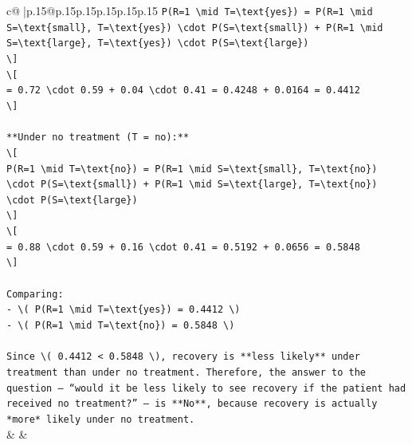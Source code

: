 \documentclass{article}
\begin{document}
{\begin{supertabular}{c@{$\;$}|p{.15\linewidth}@{}p{.15\linewidth}p{.15\linewidth}p{.15\linewidth}p{.15\linewidth}p{.15\linewidth}}
{{{\texttt{P(R=1 \textbackslash{}mid T=\textbackslash{}text\{yes\}) = P(R=1 \textbackslash{}mid S=\textbackslash{}text\{small\}, T=\textbackslash{}text\{yes\}) \textbackslash{}cdot P(S=\textbackslash{}text\{small\}) + P(R=1 \textbackslash{}mid S=\textbackslash{}text\{large\}, T=\textbackslash{}text\{yes\}) \textbackslash{}cdot P(S=\textbackslash{}text\{large\})} \\
\texttt{\textbackslash{}{]}} \\
\texttt{\textbackslash{}{[}} \\
\texttt{= 0.72 \textbackslash{}cdot 0.59 + 0.04 \textbackslash{}cdot 0.41 = 0.4248 + 0.0164 = 0.4412} \\
\texttt{\textbackslash{}{]}} \\
\\ 
\texttt{**Under no treatment (T = no):**} \\
\texttt{\textbackslash{}{[}} \\
\texttt{P(R=1 \textbackslash{}mid T=\textbackslash{}text\{no\}) = P(R=1 \textbackslash{}mid S=\textbackslash{}text\{small\}, T=\textbackslash{}text\{no\}) \textbackslash{}cdot P(S=\textbackslash{}text\{small\}) + P(R=1 \textbackslash{}mid S=\textbackslash{}text\{large\}, T=\textbackslash{}text\{no\}) \textbackslash{}cdot P(S=\textbackslash{}text\{large\})} \\
\texttt{\textbackslash{}{]}} \\
\texttt{\textbackslash{}{[}} \\
\texttt{= 0.88 \textbackslash{}cdot 0.59 + 0.16 \textbackslash{}cdot 0.41 = 0.5192 + 0.0656 = 0.5848} \\
\texttt{\textbackslash{}{]}} \\
\\ 
\texttt{Comparing:} \\
\texttt{{-} \textbackslash{}( P(R=1 \textbackslash{}mid T=\textbackslash{}text\{yes\}) = 0.4412 \textbackslash{})} \\
\texttt{{-} \textbackslash{}( P(R=1 \textbackslash{}mid T=\textbackslash{}text\{no\}) = 0.5848 \textbackslash{})} \\
\\ 
\texttt{Since \textbackslash{}( 0.4412 < 0.5848 \textbackslash{}), recovery is **less likely** under treatment than under no treatment. Therefore, the answer to the question — “would it be less likely to see recovery if the patient had received no treatment?” — is **No**, because recovery is actually *more* likely under no treatment.} \\
            }
        }
    }
    & & \\ \\


\end{supertabular}}
\end{document}
